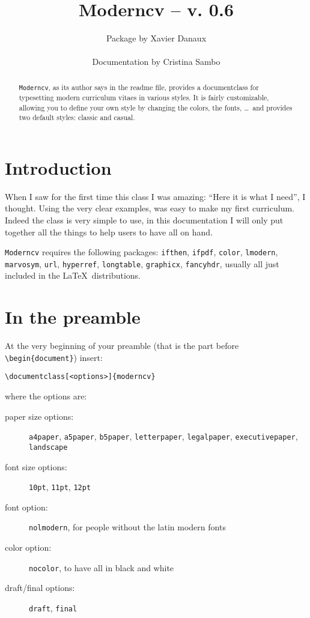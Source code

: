 \documentclass[a4paper,11pt]{article}
\title{\bfseries Moderncv -- v. 0.6}
\author{Package by Xavier Danaux \\ \begin{small}Documentation by Cristina Sambo \end{small}}
\date{}
\begin{document}
\maketitle

\begin{abstract}
\noindent \texttt{Moderncv}, as its author says in the readme file, provides a documentclass for typesetting modern curriculum vitaes in various styles. It is fairly customizable, allowing you to define your own style by changing the colors, the fonts, \dots\ and provides two default styles: classic and casual.
\end{abstract}

\section{Introduction}
When I saw for the first time this class I was amazing: ``Here it is what I need'', I thought. Using the very clear examples, was easy to make my first curriculum. 
Indeed the class is very simple to use, in this documentation I will only put together all the things to help users to have all on hand.

\smallskip
\texttt{Moderncv} requires the following packages: \texttt{ifthen}, \texttt{ifpdf}, \texttt{color}, \texttt{lmodern}, \texttt{marvosym}, \texttt{url}, \texttt{hyperref}, \texttt{longtable}, \texttt{graphicx}, \texttt{fancyhdr}, usually all just included in the \LaTeX\ distributions.

\section{In the preamble}

At the very beginning of your preamble (that is the part before \verb|\begin{document}|) insert:

\begin{verbatim}
\documentclass[<options>]{moderncv}
\end{verbatim} 

where the options are:

\begin{description}
 \item[paper size options:] \texttt{a4paper}, \texttt{a5paper}, \texttt{b5paper}, \texttt{letterpaper}, \texttt{legalpaper}, \texttt{ex\-ec\-u\-tive\-pa\-per}, \texttt{landscape}
 \item[font size options:] \texttt{10pt}, \texttt{11pt}, \texttt{12pt}
 \item[font option:] \texttt{nolmodern}, for people without the latin modern fonts
 \item[color option:] \texttt{nocolor}, to have all in black and white
 \item[draft/final options:] \texttt{draft}, \texttt{final}
\end{description}
\end{document}
